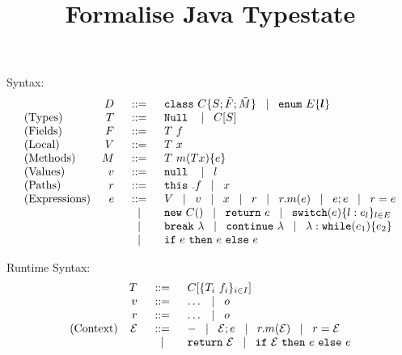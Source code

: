 \documentclass[a4paper]{llncs}
\title{Formalise Java Typestate}
\author{}
\newcommand{\class}{\ensuremath{\mathtt{class}\ }}
\newcommand{\enum}{\ensuremath{\mathtt{enum}\ }}
\newcommand{\Null}{\ensuremath{\mathtt{Null}\ }}
\newcommand{\nul}{\ensuremath{\mathtt{null}\ }}
\newcommand{\this}{\ensuremath{\mathtt{this}\ }}
\newcommand{\brk}{\ensuremath{\mathtt{break}\ }}
\newcommand{\continue}{\ensuremath{\mathtt{continue}\ }}
\newcommand{\return}{\ensuremath{\mathtt{return}\ }}
\newcommand{\ctype}[2]{#1[#2]}
\newcommand{\base}{\ensuremath{\mathtt{base}\ }}
\newcommand{\method}[4]{#1\ #2(#3)\set{#4}}
\newcommand{\vdecl}[2]{#1\ #2}
\newcommand{\mcall}[2]{#1(#2)}
\newcommand{\newo}[1]{\ensuremath{\mathtt{new}\ #1()}}
\newcommand{\switch}[2]{\ensuremath{\mathtt{switch}(#1)\set{#2}}}
\newcommand{\while}[2]{\ensuremath{\mathtt{while}(#1)\set{#2}}}
\begin{document}
	\maketitle

	Syntax:
\[
	\begin{array}{lrcl}
		&D &\bnfis& \class C \set{S; \vect{F}; \vect{M}} \bnfbar \enum E \set{\vec{l}}\\
		\textrm{(Types)} & T &\bnfis& \Null \bnfbar \ctype{C}{S}\\%
		\textrm{(Fields)} &F &\bnfis& \vdecl{T}{f}\\		
		\textrm{(Local)} &V &\bnfis& \vdecl{T}{x}\\
		\textrm{(Methods)} &M &\bnfis& \method{T}{m}{T x}{e}\\
		\textrm{(Values)} &v& \bnfis& \nul \bnfbar l\\
		\textrm{(Paths)}  &r& \bnfis & \this.f \bnfbar x\\
		\textrm{(Expressions)} &e& \bnfis & V \bnfbar v \bnfbar x \bnfbar r \bnfbar r.\mcall{m}{e} \bnfbar e;e \bnfbar r = e\\
		&&\bnfbar & \newo{C} \bnfbar \return e \bnfbar \switch{e}{l : e_l}_{l \in E} \\
		&&\bnfbar & \brk \lambda \bnfbar \continue \lambda \bnfbar \lambda: \while{e_1}{e_2}\\
		&&\bnfbar & \ifthenelse{e}{e}{e}
	\end{array}
\]

	Runtime Syntax:
\[
	\begin{array}{lrcl}
		& T & \bnfis & C[\set{T_i\ f_i}_{i \in I}]\\
		& v & \bnfis & \dots \bnfbar o\\
		& r & \bnfis & \dots \bnfbar o \\
		\textrm{(Context)} & \mathcal{E} &\bnfis& \hole \bnfbar \mathcal{E}; e \bnfbar r.m(\mathcal{E}) \bnfbar r = \mathcal{E}\\
				&&\bnfbar& \return{\mathcal{E}} \bnfbar \ifthenelse{\mathcal{E}}{e}{e}
	\end{array}
\]

%
%
\end{document}
